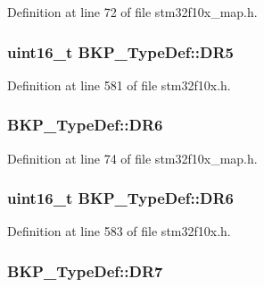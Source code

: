 Definition at line 72 of file stm32f10x\+\_\+map.\+h.

\subsubsection[{\texorpdfstring{D\+R5}{DR5}}]{ {\bf uint16\+\_\+t} B\+K\+P\+\_\+\+Type\+Def\+::\+D\+R5}\hypertarget{struct_b_k_p___type_def_a35b107064600b60af1c42a5e5a6a16c1}{}\label{struct_b_k_p___type_def_a35b107064600b60af1c42a5e5a6a16c1}


Definition at line 581 of file stm32f10x.\+h.

\subsubsection[{\texorpdfstring{D\+R6}{DR6}}]{ B\+K\+P\+\_\+\+Type\+Def\+::\+D\+R6}\hypertarget{struct_b_k_p___type_def_a2d42abd26135227baa9c742c33177da5}{}\label{struct_b_k_p___type_def_a2d42abd26135227baa9c742c33177da5}


Definition at line 74 of file stm32f10x\+\_\+map.\+h.

\subsubsection[{\texorpdfstring{D\+R6}{DR6}}]{ {\bf uint16\+\_\+t} B\+K\+P\+\_\+\+Type\+Def\+::\+D\+R6}\hypertarget{struct_b_k_p___type_def_a127b4555819656767655092cf43a4ae9}{}\label{struct_b_k_p___type_def_a127b4555819656767655092cf43a4ae9}


Definition at line 583 of file stm32f10x.\+h.

\subsubsection[{\texorpdfstring{D\+R7}{DR7}}]{ B\+K\+P\+\_\+\+Type\+Def\+::\+D\+R7}\hypertarget{struct_b_k_p___type_def_ab2e6fe770976ab68d5dc6888ecba7b58}{}\label{struct_b_k_p___type_def_ab2e6fe770976ab68d5dc6888ecba7b58}


